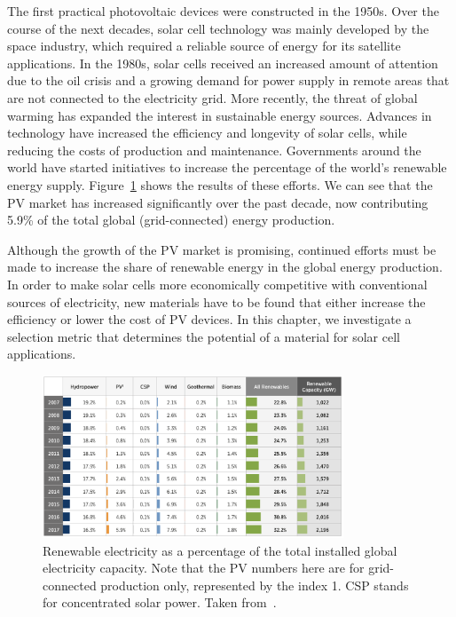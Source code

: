 \begin{refsection}
The first practical photovoltaic devices were constructed in the 1950s. Over 
the course of the next decades, solar cell technology was mainly developed by 
the space industry, which required a reliable source of energy for its 
satellite applications. In the 1980s, solar cells received an increased amount 
of attention due to the oil crisis and a growing demand for power supply in 
remote areas that are not connected to the electricity grid. More recently, 
the threat of global warming has expanded the interest in sustainable energy 
sources. Advances in technology have increased the efficiency and longevity of 
solar cells, while reducing the costs of production and maintenance. 
Governments around the world have started initiatives to increase the 
percentage of the world's renewable energy supply. 
Figure~\ref{slme:fig-pv_evo} shows the results of these efforts. We can see 
that the PV market has increased significantly over the past decade, now 
contributing 5.9\% of the total global (grid-connected) energy production. 
 
Although the growth of the PV market is promising, continued efforts must be 
made to increase the share of renewable energy in the global energy 
production. In order to make solar cells more economically competitive with 
conventional sources of electricity, new materials have to be found that 
either increase the efficiency or lower the cost of PV devices. In this 
chapter, we investigate a selection metric that determines the potential of a 
material for solar cell applications. 
 
\begin{figure}[!htp]  
\centering 
\includegraphics[width=0.8\textwidth]{./Figures/slme/pv-evo.png} 
\caption{Renewable electricity as a percentage of the total installed global 
electricity capacity. Note that the PV numbers here are for grid-connected production only, represented by the index 1. CSP stands for concentrated solar power. Taken from~\cite{NREL2017}.} 
\label{slme:fig-pv_evo}  
\end{figure} 
 

\end{refsection}
